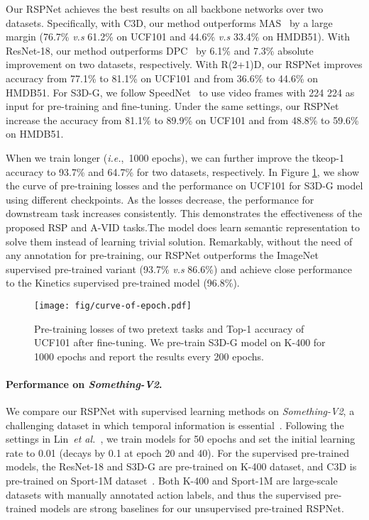 \documentclass[final]{cvpr}
\def\etal{{\em et al.\/}\, }
\def\ie{\mbox{\textit{i.e.}, }}
\begin{document}
Our RSPNet achieves the best results on all backbone networks over two datasets. 
Specifically, with C3D, our method outperforms MAS~\cite{WangJBHLL19} by a large margin (76.7\% \textit{v.s} 61.2\% on UCF101 and 44.6\% \textit{v.s} 33.4\% on HMDB51). 
With ResNet-18, our method outperforms DPC~\cite{HanXZ19} by 6.1\% and 7.3\% absolute improvement on two datasets, respectively.
With R(2+1)D, our RSPNet improves accuracy from 77.1\% to 81.1\% on UCF101 and from 36.6\% to 44.6\% on HMDB51.
For S3D-G, we follow SpeedNet~\cite{speednet} to use video frames with 224  224 as input for pre-training and fine-tuning. Under the same settings, our RSPNet increase the accuracy from 81.1\% to 89.9\% on UCF101 and from 48.8\% to 59.6\% on HMDB51. 

When we train longer (\ie 1000 epochs), we can further improve the tkeop-1 accuracy to 93.7\% and 64.7\% for two datasets, respectively. In Figure \ref{fig:curve_of_epoch}, we show the curve of pre-training losses and the performance on UCF101 for S3D-G model using different checkpoints. As the losses decrease, the performance for downstream task increases consistently. This demonstrates the effectiveness of the proposed RSP and A-VID tasks.The model does learn semantic representation to solve them instead of learning trivial solution.
Remarkably, without the need of any annotation for pre-training, our RSPNet outperforms the ImageNet supervised pre-trained variant (93.7\% \textit{v.s} 86.6\%) and achieve close performance to the Kinetics supervised pre-trained model (96.8\%).  



\begin{figure}[t]
	\centering
	\texttt{[image: fig/curve-of-epoch.pdf]}
	\caption{Pre-training losses of two pretext tasks and Top-1 accuracy of UCF101 after fine-tuning.
		We pre-train S3D-G model on K-400 for 1000 epochs and report the results every 200 epochs.
	}
	\label{fig:curve_of_epoch}
\end{figure}




\paragraph{Performance on \emph{Something-V2}.}
We compare our RSPNet with supervised learning methods on \emph{Something-V2}, a challenging dataset in which temporal information is essential~\cite{LinGH19}.
Following the settings in Lin~\etal\cite{LinGH19}, we train models for 50 epochs and set the initial learning rate to 0.01 (decays by 0.1 at epoch 20 and 40). 
For the supervised pre-trained models, the ResNet-18 and S3D-G are pre-trained on K-400 dataset, and C3D is pre-trained on Sport-1M dataset~\cite{KarpathyTSLSF14}. 
Both K-400 and Sport-1M are large-scale datasets with manually annotated action labels, and thus the supervised pre-trained models are strong baselines for our unsupervised pre-trained RSPNet.
\end{document}
